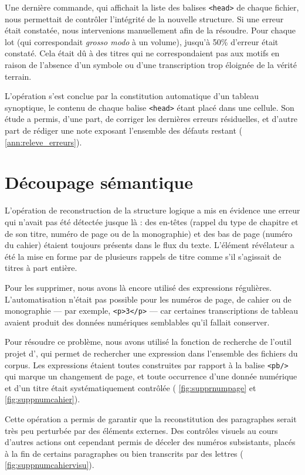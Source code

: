 Une dernière commande, qui affichait la liste des balises \texttt{<head>} de chaque fichier, nous permettait de contrôler l'intégrité de la nouvelle structure. Si une erreur était constatée, nous intervenions manuellement afin de la résoudre. Pour chaque lot (qui correspondait \textit{grosso modo} à un volume), jusqu'à 50\% d'erreur était constaté. Cela était dû à des titres qui ne correspondaient pas aux motifs en raison de l'absence d'un symbole ou d'une transcription trop éloignée de la vérité terrain.

L'opération s'est conclue par la constitution automatique d'un tableau synoptique, le contenu de chaque balise \texttt{<head>} étant placé dans une cellule. Son étude a permis, d'une part, de corriger les dernières erreurs résiduelles, et d'autre part de rédiger une note exposant l'ensemble des défauts restant (\ann{} \ref{ann:releve_erreurs}).

\section{Découpage sémantique}

L'opération de reconstruction de la structure logique a mis en évidence une erreur qui n'avait pas été détectée jusque là : des en-têtes (rappel du type de chapitre et de son titre, numéro de page ou de la monographie) et des bas de page (numéro du cahier) étaient toujours présents dans le flux du texte. L'élément révélateur a été la mise en forme par \lse{} de plusieurs rappels de titre comme s'il s'agissait de titres à part entière. 

Pour les supprimer, nous avons là encore utilisé des expressions régulières. L'automatisation n'était pas possible pour les numéros de page, de cahier ou de monographie --- par exemple, \texttt{<p>3</p>} --- car certaines transcriptions de tableau avaient produit des données numériques semblables qu'il fallait conserver.

Pour résoudre ce problème, nous avons utilisé la fonction de recherche de l'outil \og projet \fg{} d'\oxygen, qui permet de rechercher une expression dans l'ensemble des fichiers du corpus. Les expressions étaient toutes construites par rapport à la balise \texttt{<pb/>} qui marque un changement de page, et toute occurrence d'une donnée numérique et d'un titre était systématiquement contrôlée (\fig{} \ref{fig:supprnumpage} et \ref{fig:suppnumcahier}).

Cette opération a permis de garantir que la reconstitution des paragraphes serait très peu perturbée par des éléments externes. Des contrôles visuels au cours d'autres actions ont cependant permis de déceler des numéros subsistants, placés à la fin de certains paragraphes ou bien transcrits par des lettres (\fig{} \ref{fig:suppnumcahiervisu}).

